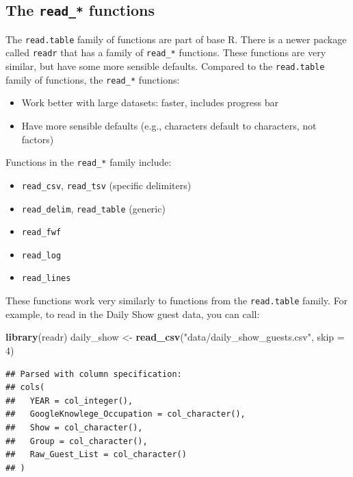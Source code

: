 \documentclass[]{book}
\makeatletter
\newenvironment{Shaded}{\begin{snugshade}}{\end{snugshade}}
\newcommand{\KeywordTok}[1]{\textcolor[rgb]{0.13,0.29,0.53}{\textbf{#1}}}
\newcommand{\DataTypeTok}[1]{\textcolor[rgb]{0.13,0.29,0.53}{#1}}
\newcommand{\DecValTok}[1]{\textcolor[rgb]{0.00,0.00,0.81}{#1}}
\newcommand{\StringTok}[1]{\textcolor[rgb]{0.31,0.60,0.02}{#1}}
\newcommand{\NormalTok}[1]{#1}
\providecommand{\tightlist}{%
  \setlength{\itemsep}{0pt}\setlength{\parskip}{0pt}}
\newenvironment{kframe}{%
\medskip{}
\setlength{\fboxsep}{.8em}
 \def\at@end@of@kframe{}%
 \ifinner\ifhmode%
  \def\at@end@of@kframe{\end{minipage}}%
  \begin{minipage}{\columnwidth}%
 \fi\fi%
 \def\FrameCommand##1{\hskip\@totalleftmargin \hskip-\fboxsep
 \colorbox{shadecolor}{##1}\hskip-\fboxsep
     \hskip-\linewidth \hskip-\@totalleftmargin \hskip\columnwidth}%
 \MakeFramed {\advance\hsize-\width
   \@totalleftmargin\z@ \linewidth\hsize
   \@setminipage}}%
 {\par\unskip\endMakeFramed%
 \at@end@of@kframe}
\renewenvironment{Shaded}{\begin{kframe}}{\end{kframe}}
\theoremstyle{definition}
\theoremstyle{definition}
\theoremstyle{definition}
\theoremstyle{remark}
\makeatother
\begin{document}
\subsection{\texorpdfstring{The \texttt{read\_*}
functions}{The read\_* functions}}\label{the-read_-functions}

The \texttt{read.table} family of functions are part of base R. There is
a newer package called \texttt{readr} that has a family of
\texttt{read\_*} functions. These functions are very similar, but have
some more sensible defaults. Compared to the \texttt{read.table} family
of functions, the \texttt{read\_*} functions:

\begin{itemize}
\tightlist
\item
  Work better with large datasets: faster, includes progress bar
\item
  Have more sensible defaults (e.g., characters default to characters,
  not factors)
\end{itemize}

Functions in the \texttt{read\_*} family include:

\begin{itemize}
\tightlist
\item
  \texttt{read\_csv}, \texttt{read\_tsv} (specific delimiters)
\item
  \texttt{read\_delim}, \texttt{read\_table} (generic)
\item
  \texttt{read\_fwf}
\item
  \texttt{read\_log}
\item
  \texttt{read\_lines}
\end{itemize}

These functions work very similarly to functions from the
\texttt{read.table} family. For example, to read in the Daily Show guest
data, you can call:

\begin{Shaded}
\begin{Highlighting}[]
\KeywordTok{library}\NormalTok{(readr)}
\NormalTok{daily_show <-}\StringTok{ }\KeywordTok{read_csv}\NormalTok{(}\StringTok{"data/daily_show_guests.csv"}\NormalTok{, }\DataTypeTok{skip =} \DecValTok{4}\NormalTok{)}
\end{Highlighting}
\end{Shaded}

\begin{verbatim}
## Parsed with column specification:
## cols(
##   YEAR = col_integer(),
##   GoogleKnowlege_Occupation = col_character(),
##   Show = col_character(),
##   Group = col_character(),
##   Raw_Guest_List = col_character()
## )
\end{verbatim}
\end{document}
